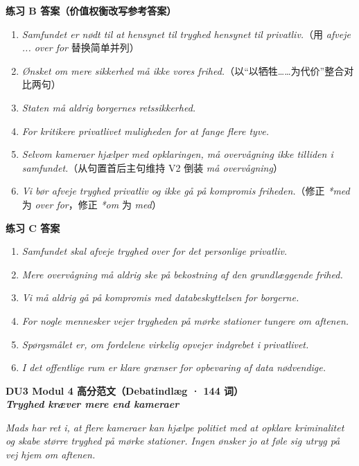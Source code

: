 \begin{answerbox}
\textbf{练习 B 答案（价值权衡改写参考答案）}
\begin{enumerate}
  \item \textit{Samfundet er nødt til at  hensynet til tryghed  hensynet til privatliv.}（用 \textit{afveje ... over for} 替换简单并列）
  \item \textit{Ønsket om mere sikkerhed må ikke  vores frihed.}（以“以牺牲……为代价”整合对比两句）
  \item \textit{Staten må aldrig  borgernes retssikkerhed.}
  \item \textit{For kritikere  privatlivet  muligheden for at fange flere tyve.}
  \item \textit{Selvom kameraer hjælper med opklaringen, må overvågning ikke  tilliden i samfundet.}（从句置首后主句维持 V2 倒装 \textit{må overvågning}）
  \item \textit{Vi bør afveje tryghed  privatliv og ikke gå på kompromis  friheden.}（修正 \textit{*med} 为 \textit{over for}，修正 \textit{*om} 为 \textit{med}）
\end{enumerate}

\textbf{练习 C 答案}
\begin{enumerate}
  \item \textit{Samfundet skal afveje tryghed over for det personlige privatliv.}
  \item \textit{Mere overvågning må aldrig ske på bekostning af den grundlæggende frihed.}
  \item \textit{Vi må aldrig gå på kompromis med databeskyttelsen for borgerne.}
  \item \textit{For nogle mennesker vejer trygheden på mørke stationer tungere om aftenen.}
  \item \textit{Spørgsmålet er, om fordelene virkelig opvejer indgrebet i privatlivet.}
  \item \textit{I det offentlige rum er klare grænser for opbevaring af data nødvendige.}
\end{enumerate}

\textbf{DU3 Modul 4 高分范文（Debatindlæg · 144 词）}\\
\textit{\textbf{Tryghed kræver mere end kameraer}}

\textit{Mads har ret i, at flere kameraer kan hjælpe politiet med at opklare kriminalitet og skabe større tryghed på mørke stationer. Ingen ønsker jo at føle sig utryg på vej hjem om aftenen.}


\end{answerbox}
